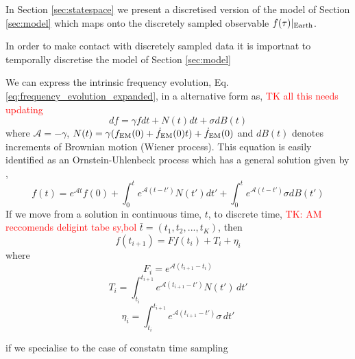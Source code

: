 \documentclass[fleqn,usenatbib,useAMS]{mnras}
\begin{document}
In Section \ref{sec:statespace} we present a discretised version of the model of Section \ref{sec:model} which maps onto the discretely sampled observable $f(\tau)|_{\rm Earth}$. 





In order to make contact with discretely sampled data it is importnat to temporally discretise the model of Section \ref{sec:model}


We can express the intrinsic frequency evolution, Eq. \ref{eq:frequency_evolution_expanded}, in a alternative form as,
\textcolor{red}{TK all this needs updating}
\begin{equation}
	df = \gamma  f dt + N(t) dt + \sigma dB(t)
	\label{eq:state1}
\end{equation}
where $\mathcal{A} = -\gamma$, $N(t) = \gamma(f_{\rm EM}(0) + \dot{f}_{\rm EM}(0) t) +\dot{f}_{\rm EM}(0)$ and $dB(t)$ denotes increments of Brownian motion (Wiener process). This equation is easily identified as an Ornstein-Uhlenbeck process which has a general solution given by \citep{gardiner2009stochastic},
\begin{equation}
	f(t) = e^{\mathcal{A}t}f(0) + \int_0^t e^{\mathcal{A}(t-t')} N(t') dt' + \int_0^t e^{\mathcal{A}(t-t')} \sigma dB(t')
\end{equation} 
If we move from a solution in continuous time, $t$, to discrete time, \textcolor{red}{TK: AM reccomends deligint tabe sy,bol} $\bar{t} = (t_1, t_2, ...,t_K)$, then
\begin{equation}
	f(t_{i+1}) = F f(t_i) + T_i + \eta_i
\end{equation}
where
\begin{equation}
	F_i = e^{\mathcal{A} (t_{i+1} - t_i)}
\end{equation}
\begin{equation}
	T_i = \int_{t_i}^{t_{i+1}}  e^{\mathcal{A} (t_{i+1} - t')} N(t') \, dt'
\end{equation}
\begin{equation}
	\eta_i = \int_{t_i}^{t_{i+1}}  e^{\mathcal{A} (t_{i+1} - t')} \sigma \, dt'
\end{equation}

if we specialise to the case of constatn time sampling 
\end{document}
